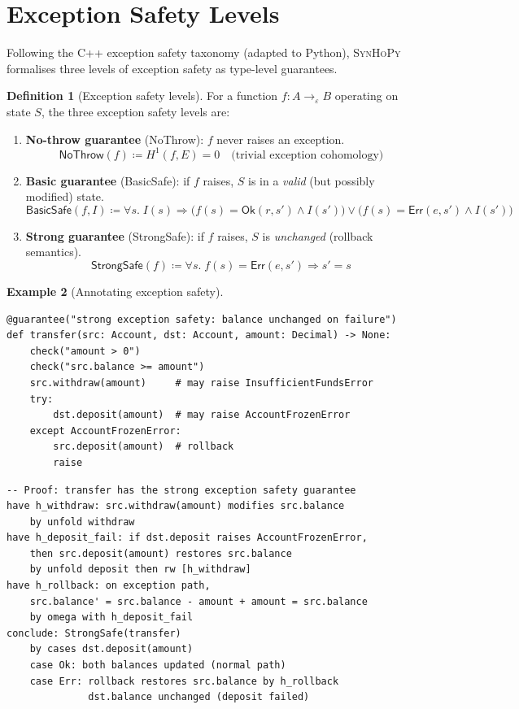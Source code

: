 \documentclass[11pt,a4paper]{report}
\theoremstyle{definition}
\newtheorem{definition}{Definition}[chapter]
\newtheorem{example}[definition]{Example}
\theoremstyle{plain}
\newcommand{\defeq}{\coloneqq}
\newcommand{\synhopy}{\textsc{SynHoPy}}
\begin{document}
\section{Exception Safety Levels}

Following the C++ exception safety taxonomy (adapted to Python), \synhopy{}
formalises three levels of exception safety as type-level guarantees.

\begin{definition}[Exception safety levels]
For a function $f : A \to_\varepsilon B$ operating on state $S$, the three
exception safety levels are:
\begin{enumerate}
  \item \textbf{No-throw guarantee} (\textsf{NoThrow}):
    $f$ never raises an exception.
    \[
      \mathsf{NoThrow}(f) \defeq H^1(f, E) = 0
      \quad\text{(trivial exception cohomology)}
    \]
  \item \textbf{Basic guarantee} (\textsf{BasicSafe}):
    if $f$ raises, $S$ is in a \emph{valid} (but possibly modified) state.
    \[
      \mathsf{BasicSafe}(f, I) \defeq
        \forall s.\; I(s) \Rightarrow
          \bigl(f(s) = \mathsf{Ok}(r, s') \wedge I(s')\bigr)
          \vee
          \bigl(f(s) = \mathsf{Err}(e, s') \wedge I(s')\bigr)
    \]
  \item \textbf{Strong guarantee} (\textsf{StrongSafe}):
    if $f$ raises, $S$ is \emph{unchanged} (rollback semantics).
    \[
      \mathsf{StrongSafe}(f) \defeq
        \forall s.\;
        f(s) = \mathsf{Err}(e, s') \Rightarrow s' = s
    \]
\end{enumerate}
\end{definition}

\begin{example}[Annotating exception safety]
\begin{lstlisting}[style=synhopy]
@guarantee("strong exception safety: balance unchanged on failure")
def transfer(src: Account, dst: Account, amount: Decimal) -> None:
    check("amount > 0")
    check("src.balance >= amount")
    src.withdraw(amount)     # may raise InsufficientFundsError
    try:
        dst.deposit(amount)  # may raise AccountFrozenError
    except AccountFrozenError:
        src.deposit(amount)  # rollback
        raise
\end{lstlisting}
\end{example}

\begin{lstlisting}[style=proof]
-- Proof: transfer has the strong exception safety guarantee
have h_withdraw: src.withdraw(amount) modifies src.balance
    by unfold withdraw
have h_deposit_fail: if dst.deposit raises AccountFrozenError,
    then src.deposit(amount) restores src.balance
    by unfold deposit then rw [h_withdraw]
have h_rollback: on exception path,
    src.balance' = src.balance - amount + amount = src.balance
    by omega with h_deposit_fail
conclude: StrongSafe(transfer)
    by cases dst.deposit(amount)
    case Ok: both balances updated (normal path)
    case Err: rollback restores src.balance by h_rollback
              dst.balance unchanged (deposit failed)
\end{lstlisting}
\end{document}
